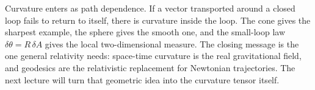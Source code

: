Curvature enters as path dependence. If a vector transported around a closed loop fails to return to itself, there is curvature inside the loop. The cone gives the sharpest example, the sphere gives the smooth one, and the small-loop law \(\delta\theta=R\,\delta A\) gives the local two-dimensional measure. The closing message is the one general relativity needs: space-time curvature is the real gravitational field, and geodesics are the relativistic replacement for Newtonian trajectories. The next lecture will turn that geometric idea into the curvature tensor itself.